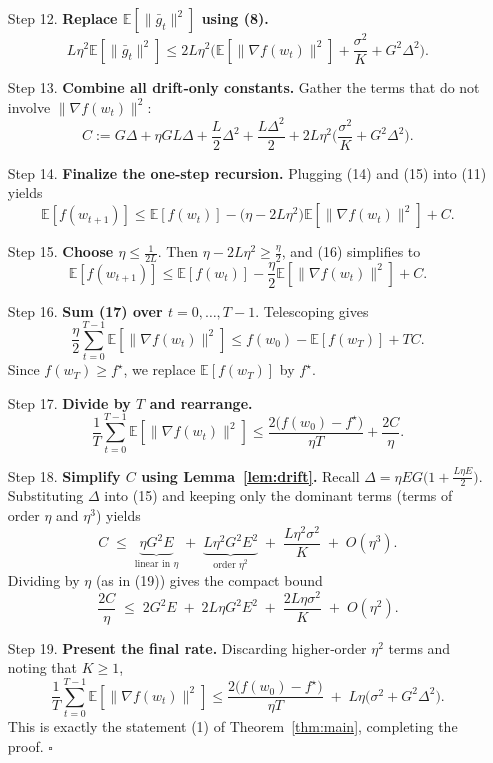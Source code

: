 \documentclass{article}
\newcommand{\E}{\mathbb{E}}
\begin{document}
\begin{enumerate}
\item[Step 12.] \textbf{Replace $\E[\|\bar g_t\|^2]$ using (8).}
\[
L\eta^2\E[\|\bar g_t\|^2]
\le 2L\eta^2\Big(\E[\|\nabla f(w_t)\|^2]
               +\frac{\sigma^2}{K}+G^2\Delta^2\Big).
\tag{14}
\]

\item[Step 13.] \textbf{Combine all drift‑only constants.}
Gather the terms that do not involve $\|\nabla f(w_t)\|^2$:
\[
C:= G\Delta +\eta G L\Delta +\frac{L}{2}\Delta^2 +\frac{L\Delta^2}{2}
    +2L\eta^2\Big(\frac{\sigma^2}{K}+G^2\Delta^2\Big).
\tag{15}
\]

\item[Step 14.] \textbf{Finalize the one‑step recursion.}
Plugging (14) and (15) into (11) yields
\[
\E[f(w_{t+1})]
\le \E[f(w_t)]
   -\Big(\eta-2L\eta^2\Big)\E[\|\nabla f(w_t)\|^2]
   + C .
\tag{16}
\]

\item[Step 15.] \textbf{Choose $\eta\le\frac1{2L}$}.  
Then $\eta-2L\eta^2\ge\frac{\eta}{2}$, and (16) simplifies to
\[
\E[f(w_{t+1})]
\le \E[f(w_t)]
   -\frac{\eta}{2}\E[\|\nabla f(w_t)\|^2]
   + C .
\tag{17}
\]

\item[Step 16.] \textbf{Sum (17) over $t=0,\dots,T-1$}.  
Telescoping gives
\[
\frac{\eta}{2}\sum_{t=0}^{T-1}\E[\|\nabla f(w_t)\|^2]
\le f(w_0)-\E[f(w_T)] + T C .
\tag{18}
\]
Since $f(w_T)\ge f^\star$, we replace $\E[f(w_T)]$ by $f^\star$.

\item[Step 17.] \textbf{Divide by $T$ and rearrange.}
\[
\frac1T\sum_{t=0}^{T-1}\E[\|\nabla f(w_t)\|^2]
\le \frac{2\big(f(w_0)-f^\star\big)}{\eta T}
   +\frac{2C}{\eta}.
\tag{19}
\]

\item[Step 18.] \textbf{Simplify $C$ using Lemma~\ref{lem:drift}.}
Recall $\Delta=\eta E G\bigl(1+\frac{L\eta E}{2}\bigr)$.  
Substituting $\Delta$ into (15) and keeping only the dominant terms
(terms of order $\eta$ and $\eta^3$) yields
\[
C \;\le\; \underbrace{\eta G^2 E}_{\text{linear in }\eta}
          \;+\;
          \underbrace{L\eta^2 G^2 E^2}_{\text{order }\eta^2}
          \;+\;
          \frac{L\eta^2\sigma^2}{K}
          \;+\;
          O(\eta^3) .
\]
Dividing by $\eta$ (as in (19)) gives the compact bound
\[
\frac{2C}{\eta}
\;\le\;
2G^2E
\;+\;
2L\eta G^2E^2
\;+\;
\frac{2L\eta\sigma^2}{K}
\;+\;O(\eta^2) .
\]

\item[Step 19.] \textbf{Present the final rate.}  
Discarding higher‑order $\eta^2$ terms and noting that $K\ge1$,
\[
\frac1T\sum_{t=0}^{T-1}\E[\|\nabla f(w_t)\|^2]
\le
\frac{2\big(f(w_0)-f^\star\big)}{\eta T}
\;+\;
L\eta\big(\sigma^2+G^2\Delta^2\big) .
\]
This is exactly the statement (1) of Theorem~\ref{thm:main},
completing the proof. \hfill $\square$
\end{enumerate}
\end{document}

